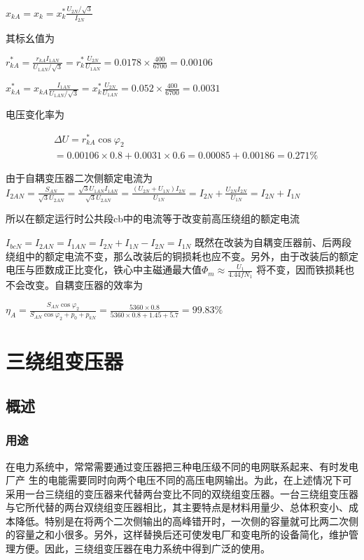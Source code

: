 \documentclass{book}
\begin{document}
${{x}_{kA}}={{x}_{k}}=x_{k}^{*}\frac{{{U}_{2N}}/\sqrt{3}}{{{I}_{2N}}}$

其标幺值为

$r_{kA}^{*}=\frac{{{r}_{kA}}{{I}_{1AN}}}{{{U}_{1AN}}/\sqrt{3}}=r_{k}^{*}\frac{{{U}_{2N}}}{{{U}_{1AN}}}=0.0178\times \frac{400}{6700}=0.00106$

$x_{kA}^{*}={{x}_{kA}}\frac{{{I}_{1AN}}}{{{U}_{1AN}}/\sqrt{3}}=x_{k}^{*}\frac{{{U}_{2N}}}{{{U}_{1AN}}}=0.052\times \frac{400}{6700}=0.0031$

电压变化率为

\begin{align}
& \Delta U=r_{kA}^{*}\cos {{\varphi }_{2}} \\ 
& =0.00106\times 0.8+0.0031\times 0.6=0.00085+0.00186=0.271\%
\label{}
\end{align}

由于自耦变压器二次侧额定电流为
${{I}_{2AN}}=\frac{{{S}_{AN}}}{\sqrt{3}{{U}_{2AN}}}=\frac{\sqrt{3}{{U}_{1AN}}{{I}_{1AN}}}{\sqrt{3}{{U}_{2AN}}}=\frac{\left( {{U}_{2N}}+{{U}_{1N}} \right){{I}_{2N}}}{{{U}_{1N}}}={{I}_{2N}}+\frac{{{U}_{2N}}{{I}_{2N}}}{{{U}_{1N}}}={{I}_{2N}}+{{I}_{1N}}$

所以在额定运行时公共段cb中的电流等于改变前高压绕组的额定电流

${{I}_{bcN}}={{I}_{2AN}}={{I}_{1AN}}={{I}_{2N}}+{{I}_{1N}}-{{I}_{2N}}={{I}_{1N}}$
既然在改装为自耦变压器前、后两段绕组中的额定电流不变，那么改装后的铜损耗也应不变。另外，由于改装后的额定电压与匝数成正比变化，铁心中主磁通最大值${{\Phi }_{m}}\approx \frac{{{U}_{1}}}{4.44f{{N}_{1}}}$ 将不变，因而铁损耗也不会改变。自耦变压器的效率为

${{\eta }_{A}}=\frac{{{S}_{AN}}\cos {{\varphi }_{2}}}{{{S}_{AN}}\cos {{\varphi }_{2}}+{{p}_{0}}+{{p}_{kN}}}=\frac{5360\times 0.8}{5360\times 0.8+1.45+5.7}=99.83\%$

\section{三绕组变压器}
\subsection{概述}
\subsubsection{用途}

在电力系统中，常常需要通过变压器把三种电压级不同的电网联系起来、有时发电厂产 生的电能需要同时向两个电压不同的高压电网输出。为此，在上述情况下可采用一台三绕组的变压器来代替两台变比不同的双绕组变压器。一台三绕组变压器与它所代替的两台双绕组变压器相比，其主要特点是材料用量少、总体积变小、成本降低。特别是在将两个二次侧输出的高峰错开时，一次侧的容量就可比两二次侧的容量之和小很多。另外，这样替换后还可使发电厂和变电所的设备简化，维护管理方便。因此，三绕组变压器在电力系统中得到广泛的使用。
\end{document}
